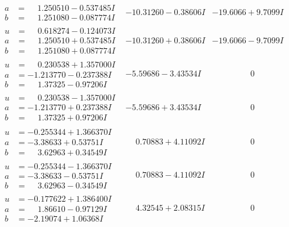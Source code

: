 \documentclass[1p]{elsarticle_modified}
\theoremstyle{definition}
\begin{document}
$$\begin{array}{c|c|c}
\begin{aligned}
a &= \phantom{-}1.250510 - 0.537485 I \\
b &= \phantom{-}1.251080 - 0.087774 I\end{aligned}
 & -10.31260 - 0.38606 I & -19.6066 + 9.7099 I \\ \hline\begin{aligned}
u &= \phantom{-}0.618274 - 0.124073 I \\
a &= \phantom{-}1.250510 + 0.537485 I \\
b &= \phantom{-}1.251080 + 0.087774 I\end{aligned}
 & -10.31260 + 0.38606 I & -19.6066 - 9.7099 I \\ \hline\begin{aligned}
u &= \phantom{-}0.230538 + 1.357000 I \\
a &= -1.213770 - 0.237388 I \\
b &= \phantom{-}1.37325 - 0.97206 I\end{aligned}
 & -5.59686 - 3.43534 I & \phantom{-0.000000 } 0 \\ \hline\begin{aligned}
u &= \phantom{-}0.230538 - 1.357000 I \\
a &= -1.213770 + 0.237388 I \\
b &= \phantom{-}1.37325 + 0.97206 I\end{aligned}
 & -5.59686 + 3.43534 I & \phantom{-0.000000 } 0 \\ \hline\begin{aligned}
u &= -0.255344 + 1.366370 I \\
a &= -3.38633 + 0.53751 I \\
b &= \phantom{-}3.62963 + 0.34549 I\end{aligned}
 & \phantom{-}0.70883 + 4.11092 I & \phantom{-0.000000 } 0 \\ \hline\begin{aligned}
u &= -0.255344 - 1.366370 I \\
a &= -3.38633 - 0.53751 I \\
b &= \phantom{-}3.62963 - 0.34549 I\end{aligned}
 & \phantom{-}0.70883 - 4.11092 I & \phantom{-0.000000 } 0 \\ \hline\begin{aligned}
u &= -0.177622 + 1.386400 I \\
a &= \phantom{-}1.86610 - 0.97129 I \\
b &= -2.19074 + 1.06368 I\end{aligned}
 & \phantom{-}4.32545 + 2.08315 I & \phantom{-0.000000 } 0 \\ \hline\begin{aligned}

\end{aligned}
\end{array}$$
\end{document}
